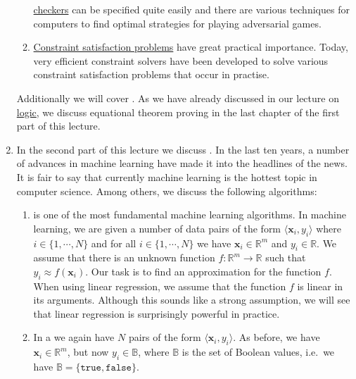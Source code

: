 \begin{enumerate}
\begin{enumerate}
            \href{https://en.wikipedia.org/wiki/checkers}{checkers} can be specified quite easily and there are
            various techniques for computers to find optimal strategies for playing adversarial games.
      \item \href{https://en.wikipedia.org/wiki/Constraint_satisfaction_problem}{Constraint satisfaction problems} 
            have great practical importance.  Today, very efficient constraint solvers have been developed to
            solve various constraint satisfaction problems that occur in practise.
      \end{enumerate}
      Additionally we will cover .  As we have already discussed 
       in our lecture on
      \href{https://github.com/karlstroetmann/Logic}{logic}, we discuss equational  
      theorem proving in the last chapter of the first part of this lecture.
\item In the second part of this lecture we discuss .  In the last ten years, a number of
      advances in machine learning have made it into the headlines of the news.  It is fair to say that
      currently machine learning is the hottest topic in computer science.  Among others, we discuss the following
      algorithms:
      \begin{enumerate}
      \item {} is one of the most fundamental machine learning algorithms.
            In machine learning, we are given a number of data pairs of the form  $\langle \mathbf{x}_i, y_i \rangle$ 
            where $i \in \{1,\cdots,N\}$ and for all $i \in \{1,\cdots,N\}$ we have $\mathbf{x}_i \in \mathbb{R}^m$
            and $y_i \in \mathbb{R}$.  We assume that there is an unknown function $f:\mathbb{R}^m \rightarrow \mathbb{R}$
            such that $y_i \approx f(\mathbf{x}_i)$.  Our task is to find an approximation for the function
            $f$.  When using linear regression, we assume that the function $f$ is linear in its arguments.
            Although this sounds like a strong assumption, we will see that linear regression is surprisingly
            powerful in practice.
      \item In a  we again have $N$ pairs of the form $\langle \mathbf{x}_i, y_i
        \rangle$.
            As before,  we have $\mathbf{x}_i \in \mathbb{R}^m$, but now $y_i \in \mathbb{B}$, where
            $\mathbb{B}$ is the set of Boolean values, i.e.~we have $\mathbb{B} = \{\mathtt{true}, \mathtt{false}\}$.

\end{enumerate}
\end{enumerate}
